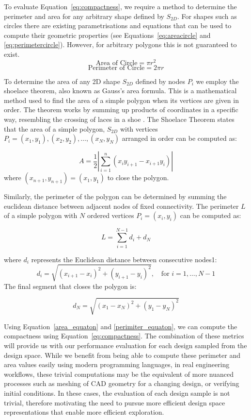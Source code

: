 \documentclass{article}
\begin{document}
To evaluate Equation~\eqref{eq:compactness}, we require a method to determine the perimeter and area for any arbitrary shape defined by $S_{2D}$. For shapes such as circles there are existing parametrisations and equations that can be used to compute their geometric properties (see Equations~\eqref{eq:areacircle} and \eqref{eq:perimetercircle}). However, for arbitrary polygons this is not guaranteed to exist.
\begin{equation}
    \text{Area of Circle}= \pi r^2 
    \label{eq:areacircle}
\end{equation}
\begin{equation}
    \text{Perimeter of Circle}= 2\pi r
    \label{eq:perimetercircle}
\end{equation}

To determine the area of any 2D shape $S_{2D}$ defined by nodes $P_i$ we employ the shoelace theorem, also known as Gauss's area formula. This is a mathematical method used to find the area of a simple polygon when its vertices are given in order. The theorem works by summing up products of coordinates in a specific way, resembling the crossing of laces in a shoe \citep{Braden1986}.
The Shoelace Theorem states that the area of a simple polygon, $S_{2D}$ with vertices $P_i =(x_1, y_1), (x_2, y_2), \dots, (x_N, y_N)$ arranged in order can be computed as:

\begin{equation}
A = \frac{1}{2} \left| \sum_{i=1}^{n} (x_i y_{i+1} - x_{i+1} y_i) \right|
\label{area_equaton}
\end{equation}
where \((x_{n+1}, y_{n+1}) = (x_1, y_1)\) to close the polygon.

Similarly, the perimeter of the polygon can be determined by summing the euclidean distance between adjacent nodes of fixed connectivity. The perimeter \( L \) of a simple polygon with \( N \) ordered vertices \( P_i = (x_i, y_i) \) can be computed as:


\begin{equation}
    L = \sum_{i=1}^{N-1} d_i + d_N
    \label{perimiter_equaton}
\end{equation}

where \( d_i \) represents the Euclidean distance between consecutive nodes1:
\[
d_i = \sqrt{(x_{i+1} - x_i)^2 + (y_{i+1} - y_i)^2}, \quad \text{for } i = 1, \dots, N-1
\]
The final segment that closes the polygon is:

\[
d_N = \sqrt{(x_1 - x_N)^2 + (y_1 - y_N)^2}
\]

Using Equation~\ref{area_equaton} and \ref{perimiter_equaton}, we can compute the compactness using Equation~\ref{eq:compactness}. The combination of these metrics will provide us with our performance evaluation for each design sampled from the design space. While we benefit from being able to compute these perimeter and area values easily using modern programming languages, in real engineering workflows, these trivial computations may be the equivalent of more nuanced processes such as meshing of CAD geometry for a changing design, or verifying initial conditions. In these cases, the evaluation of each design sample is not trivial, therefore motivating the need to pursue more efficient design space representations that enable more efficient exploration.
\end{document}
